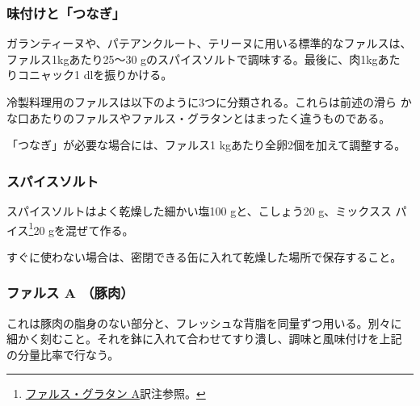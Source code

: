 \vspace*{1\zw}
\begin{recette}
\hypertarget{assaisonnement-et-liaison}{%
\subsubsection{味付けと「つなぎ」}\label{assaisonnement-et-liaison}}


ガランティーヌや、パテアンクルート、テリーヌに用いる標準的なファルスは、
ファルス1kgあたり25〜30 gのスパイスソルトで調味する。最後に、肉1kgあた
りコニャック1\undemi{} dlを振りかける。

冷製料理用のファルスは以下のように3つに分類される。これらは前述の滑ら
かな口あたりのファルスやファルス・グラタンとはまったく違うものである。

「つなぎ」が必要な場合には、ファルス1 kgあたり全卵2個を加えて調整する。

\hypertarget{sel-epice}{%
\subsubsection{スパイスソルト}\label{sel-epice}}


 

スパイスソルトはよく乾燥した細かい塩100 gと、こしょう20 g、ミックスス
パイス\footnote{\protect\hyperlink{farce-gratin-a}{ファルス・グラタン
  A}訳注参照。}20 gを混ぜて作る。

すぐに使わない場合は、密閉できる缶に入れて乾燥した場所で保存すること。

\hypertarget{farce-froide-a}{%
\subsubsection{ファルス A （豚肉）}\label{farce-froide-a}}



これは豚肉の脂身のない部分と、フレッシュな背脂を同量ずつ用いる。別々に
細かく刻むこと。それを鉢に入れて合わせてすり潰し、調味と風味付けを上記
の分量比率で行なう。


\end{recette}
